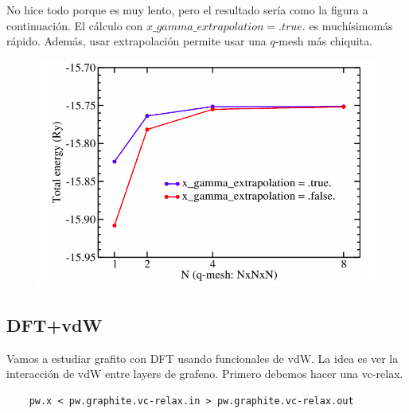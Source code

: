   No hice todo porque es muy lento, pero el resultado sería como la figura a continuación. El cálculo con $x\_gamma\_extrapolation = .true.$ es muchísimomás rápido. Además, usar extrapolación permite usar una $q$-mesh más chiquita.

  \begin{figure}[H]
      \centering
      \includegraphics[scale = 0.5]{figs/D4/hibridos.png}
  \end{figure}

\subsection{DFT+vdW}

  Vamos a estudiar grafito con DFT usando funcionales de vdW. La idea es ver la interacción de vdW entre layers de grafeno. Primero debemos hacer una vc-relax.
  \begin{verbatim}
    pw.x < pw.graphite.vc-relax.in > pw.graphite.vc-relax.out
  \end{verbatim}

